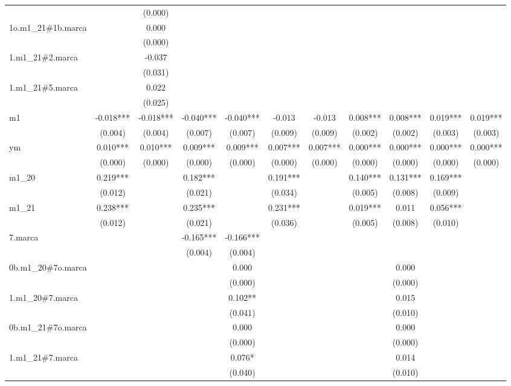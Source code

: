 \begin{tabular}{lcccccccccc}
 &  & (0.000) &  &  &  &  &  &  &  &  \\
1o.m1\_21\#1b.marca &  & 0.000 &  &  &  &  &  &  &  &  \\
 &  & (0.000) &  &  &  &  &  &  &  &  \\
1.m1\_21\#2.marca &  & -0.037 &  &  &  &  &  &  &  &  \\
 &  & (0.031) &  &  &  &  &  &  &  &  \\
1.m1\_21\#5.marca &  & 0.022 &  &  &  &  &  &  &  &  \\
 &  & (0.025) &  &  &  &  &  &  &  &  \\
m1 & -0.018*** & -0.018*** & -0.040*** & -0.040*** & -0.013 & -0.013 & 0.008*** & 0.008*** & 0.019*** & 0.019*** \\
 & (0.004) & (0.004) & (0.007) & (0.007) & (0.009) & (0.009) & (0.002) & (0.002) & (0.003) & (0.003) \\
ym & 0.010*** & 0.010*** & 0.009*** & 0.009*** & 0.007*** & 0.007*** & 0.000*** & 0.000*** & 0.000*** & 0.000*** \\
 & (0.000) & (0.000) & (0.000) & (0.000) & (0.000) & (0.000) & (0.000) & (0.000) & (0.000) & (0.000) \\
m1\_20 & 0.219*** &  & 0.182*** &  & 0.191*** &  & 0.140*** & 0.131*** & 0.169*** &  \\
 & (0.012) &  & (0.021) &  & (0.034) &  & (0.005) & (0.008) & (0.009) &  \\
m1\_21 & 0.238*** &  & 0.235*** &  & 0.231*** &  & 0.019*** & 0.011 & 0.056*** &  \\
 & (0.012) &  & (0.021) &  & (0.036) &  & (0.005) & (0.008) & (0.010) &  \\
7.marca &  &  & -0.165*** & -0.166*** &  &  &  &  &  &  \\
 &  &  & (0.004) & (0.004) &  &  &  &  &  &  \\
0b.m1\_20\#7o.marca &  &  &  & 0.000 &  &  &  & 0.000 &  &  \\
 &  &  &  & (0.000) &  &  &  & (0.000) &  &  \\
1.m1\_20\#7.marca &  &  &  & 0.102** &  &  &  & 0.015 &  &  \\
 &  &  &  & (0.041) &  &  &  & (0.010) &  &  \\
0b.m1\_21\#7o.marca &  &  &  & 0.000 &  &  &  & 0.000 &  &  \\
 &  &  &  & (0.000) &  &  &  & (0.000) &  &  \\
1.m1\_21\#7.marca &  &  &  & 0.076* &  &  &  & 0.014 &  &  \\
 &  &  &  & (0.040) &  &  &  & (0.010) &  &  \\

\end{tabular}
